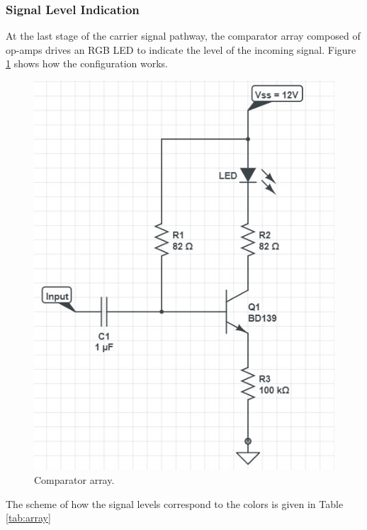 \documentclass[a4paper,10pt]{IEEEtran}
\begin{document}
\subsubsection{Signal Level Indication}
At the last stage of the carrier signal pathway, the comparator array composed of op-amps drives an RGB LED to indicate the level of the incoming signal. Figure \ref{array} shows how the configuration works.
\begin{figure}[htbp!]
    \centering
    \includegraphics[width = 1\linewidth]{Led Driver Circuit.jpg}
    \caption{Comparator array.}
    \label{array}
\end{figure}
The scheme of how the signal levels correspond to the colors is given in Table \ref{tab:array}
\end{document}
